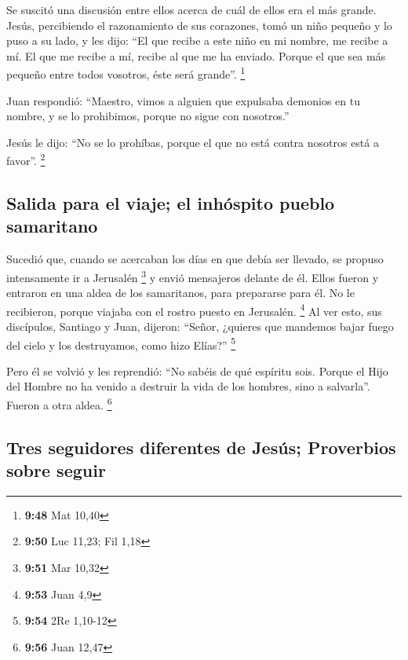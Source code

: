 \begin{paracol}{2}
 Se suscitó una discusión entre ellos acerca de cuál de
ellos era el más grande.  Jesús, percibiendo el
razonamiento de sus corazones, tomó un niño pequeño y lo puso a su lado,
 y les dijo: ``El que recibe a este niño en mi nombre, me
recibe a mí. El que me recibe a mí, recibe al que me ha enviado. Porque
el que sea más pequeño entre todos vosotros, éste será grande''.
\footnote{\textbf{9:48} Mat 10,40}

 Juan respondió: ``Maestro, vimos a alguien que expulsaba
demonios en tu nombre, y se lo prohibimos, porque no sigue con
nosotros.''

 Jesús le dijo: ``No se lo prohíbas, porque el que no
está contra nosotros está a favor''. \footnote{\textbf{9:50} Luc 11,23;
  Fil 1,18}

\hypertarget{salida-para-el-viaje-el-inhuxf3spito-pueblo-samaritano}{%
\subsection{Salida para el viaje; el inhóspito pueblo
samaritano}\label{salida-para-el-viaje-el-inhuxf3spito-pueblo-samaritano}}

 Sucedió que, cuando se acercaban los días en que debía
ser llevado, se propuso intensamente ir a Jerusalén \footnote{\textbf{9:51}
  Mar 10,32}  y envió mensajeros delante de él. Ellos
fueron y entraron en una aldea de los samaritanos, para prepararse para
él.  No le recibieron, porque viajaba con el rostro
puesto en Jerusalén. \footnote{\textbf{9:53} Juan 4,9} 
Al ver esto, sus discípulos, Santiago y Juan, dijeron: ``Señor, ¿quieres
que mandemos bajar fuego del cielo y los destruyamos, como hizo Elías?''
\footnote{\textbf{9:54} 2Re 1,10-12}

 Pero él se volvió y les reprendió: ``No sabéis de qué
espíritu sois.  Porque el Hijo del Hombre no ha venido a
destruir la vida de los hombres, sino a salvarla''. Fueron a otra aldea.
\footnote{\textbf{9:56} Juan 12,47}

\hypertarget{tres-seguidores-diferentes-de-jesuxfas-proverbios-sobre-seguir}{%
\subsection{Tres seguidores diferentes de Jesús; Proverbios sobre
seguir}\label{tres-seguidores-diferentes-de-jesuxfas-proverbios-sobre-seguir}}


\end{paracol}

